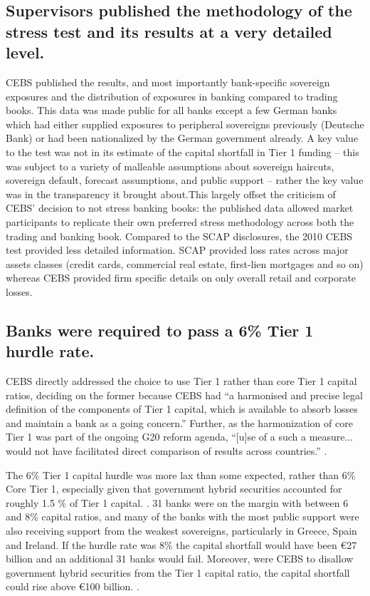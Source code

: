 \documentclass[12pt]{article}
\begin{document}
\subsection{Supervisors published the methodology of the stress test and its results at a very detailed level.}

CEBS published the results, and most importantly bank-specific sovereign exposures and the distribution of exposures in banking compared to trading books. This data was made public for all banks except a few German banks which had either supplied exposures to peripheral sovereigns previously (Deutsche Bank) or had been nationalized by the German government already. A key value to the test was not in its estimate of the capital shortfall in Tier 1 funding -- this was subject to a variety of malleable assumptions about sovereign haircuts, sovereign default, forecast assumptions, and public support -- rather the key value was in the transparency it brought about.This largely offset the criticism of CEBS' decision to not stress banking books: the published data allowed market participants to replicate their own preferred stress methodology across both the trading and banking book. Compared to the SCAP disclosures, the 2010 CEBS test provided less detailed information. SCAP provided loss rates across major assets classes (credit cards, commercial real estate, first-lien mortgages and so on) whereas CEBS provided firm specific details on only overall retail and corporate losses.

\subsection{Banks were required to pass a 6\% Tier 1 hurdle rate.}

CEBS directly addressed the choice to use Tier 1 rather than core Tier 1 capital ratios, deciding on the former because CEBS had ``a harmonised and precise legal definition of the components of Tier 1 capital, which is available to absorb losses and maintain a bank as a going concern.'' Further, as the harmonization of core Tier 1 was part of the ongoing G20 reform agenda, ``[u]se of a such a measure... would not have facilitated direct comparison of results across countries.'' \citep{QA}.

The 6\% Tier 1 capital hurdle was more lax than some expected, rather than 6\% Core Tier 1, especially given that government hybrid securities accounted for roughly 1.5 \%  of Tier 1 capital. \citep{Gonzalez}. 31 banks were on the margin with between 6 and 8\% capital ratios, and many of the banks with the most public support were also receiving support from the weakest sovereigns, particularly in Greece, Spain and Ireland. If the hurdle rate was 8\% the capital shortfall would have been \euro{27} billion and an additional 31 banks would fail. Moreover, were CEBS to disallow government hybrid securities from the Tier 1 capital ratio, the capital shortfall could rise above \euro{100} billion. \citep{Spick}.
\end{document}
